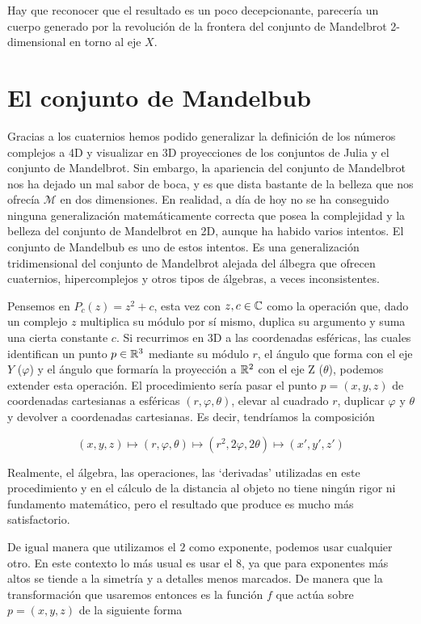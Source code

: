 Hay que reconocer que el resultado es un poco decepcionante, parecería un cuerpo generado por la revolución de la frontera del conjunto de Mandelbrot 2-dimensional en torno al eje $X$.

\section{El conjunto de Mandelbub}

Gracias a los cuaternios hemos podido generalizar la definición de los números complejos a 4D y visualizar en 3D proyecciones de los conjuntos de Julia y el conjunto de Mandelbrot. Sin embargo, la apariencia del conjunto de Mandelbrot nos ha dejado un mal sabor de boca, y es que dista bastante de la belleza que nos ofrecía $\mathcal{M}$ en dos dimensiones. En realidad, a día de hoy no se ha conseguido ninguna generalización matemáticamente correcta que posea la complejidad y la belleza del conjunto de Mandelbrot en 2D, aunque ha habido varios intentos. El conjunto de Mandelbub es uno de estos intentos. Es una generalización tridimensional del conjunto de Mandelbrot alejada del álbegra que ofrecen cuaternios, hipercomplejos y otros tipos de álgebras, a veces inconsistentes. 

Pensemos en $P_c(z)=z^2+c$, esta vez con $z,c\in\mathbb{C}$ como la operación que, dado un complejo $z$ multiplica su módulo por sí mismo, duplica su argumento y suma una cierta constante $c$. Si recurrimos en 3D a las coordenadas esféricas, las cuales identifican un punto $p\in\mathbb{R}^3$ mediante su módulo $r$, el ángulo que forma con el eje $Y$ ($\varphi$) y el ángulo que formaría la proyección a $\mathbb{R}^2$ con el eje Z ($\theta$), podemos extender esta operación. El procedimiento sería pasar el punto $p=(x,y,z)$ de coordenadas cartesianas a esféricas $(r,\varphi,\theta)$, elevar al cuadrado $r$, duplicar $\varphi$ y $\theta$ y devolver a coordenadas cartesianas. Es decir, tendríamos la composición 

$$
(x,y,z)\longmapsto(r,\varphi,\theta)\longmapsto(r^2,2\varphi,2\theta)\longmapsto(x',y',z')
$$

Realmente, el álgebra, las operaciones, las `derivadas' utilizadas en este procedimiento y en el cálculo de la distancia al objeto no tiene ningún rigor ni fundamento matemático, pero el resultado que produce es mucho más satisfactorio.

De igual manera que utilizamos el $2$ como exponente, podemos usar cualquier otro. En este contexto lo más usual es usar el 8, ya que para exponentes más altos se tiende a la simetría y a detalles menos marcados. De manera que la transformación que usaremos entonces es la función $f$ que actúa sobre $p=(x,y,z)$ de la siguiente forma

